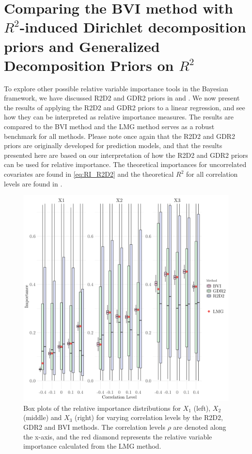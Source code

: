 \section{Comparing the BVI method with \texorpdfstring{$R^2$}{Lg}-induced Dirichlet decomposition priors and Generalized Decomposition Priors on \texorpdfstring{$R^2$}{Lg}}
To explore other possible relative variable importance tools in the Bayesian framework, we have discussed R2D2 and GDR2 priors in  and . We now present the results of applying the R2D2 and GDR2 priors to a linear regression, and see how they can be interpreted as relative importance measures. The results are compared to the BVI method and the LMG method serves as a robust benchmark for all methods. Please note once again that the R2D2 and GDR2 priors are originally developed for prediction models, and that the results presented here are based on our interpretation of how the R2D2 and GDR2 priors can be used for relative importance. The theoretical importances for uncorrelated covariates are found in \eqref{eq:RI_R2D2} and the theoretical $R^2$ for all correlation levels are found in . 
\begin{figure}[H]%
  \centering
  \includegraphics[width=1\linewidth]{Figures/R2D2_BVI_Comparison/R2D2_BVI_boxplot.png}
  \caption[Comparison of the relative importance from the BVI method and the shrinkage prior methods]{Box plots of the relative importance distributions for $X_1$ (left), $X_2$ (middle) and $X_3$ (right) for varying correlation levels by the R2D2, GDR2 and BVI methods. The correlation levels $\rho$ are denoted along the x-axis, and the red diamond represents the relative variable importance calculated from the LMG method.}
  \label{fig:r2d2_importance}
\end{figure}
